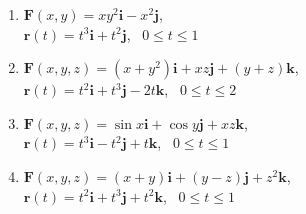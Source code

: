 	\begin{enumerate}[resume]
	
		\item $\textbf{F}(x,y) = xy^{2}\textbf{i} - x^{2}\textbf{j}$, \\ $\textbf{r}(t) = t^{3}\textbf{i} + t^{2}\textbf{j}$, \, $0 \leq t \leq 1$

		\item $\textbf{F}(x,y,z) = (x + y^2)\textbf{i} + xz\textbf{j} + (y + z)\textbf{k}$, \\ $\textbf{r}(t) = t^{2}\textbf{i} + t^{3}\textbf{j} - 2t\textbf{k}$, \, $0 \leq t \leq 2$

		\item $\textbf{F}(x,y,z) = \sin{x}\textbf{i} + \cos{y}\textbf{j} + xz\textbf{k}$, \\ $\textbf{r}(t) = t^{3}\textbf{i} - t^{2}\textbf{j} + t\textbf{k}$, \, $0 \leq t \leq 1$

		\item $\textbf{F}(x,y,z) = (x + y)\textbf{i} + (y - z)\textbf{j} + z^2\textbf{k}$, \\ $\textbf{r}(t) = t^{2}\textbf{i} + t^{3}\textbf{j} + t^{2}\textbf{k}$, \, $0 \leq t \leq 1$
		\resposta{\fazer}
	
	\end{enumerate}
		
	\vspace{5mm}	
	
	


